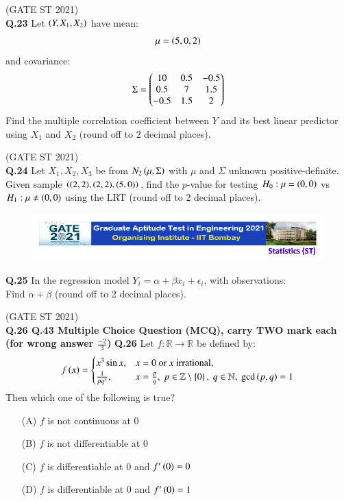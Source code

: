 \documentclass[journal,12pt,onecolumn]{IEEEtran}
\theoremstyle{remark}
\begin{document}
\hfill (GATE ST 2021) \\

\textbf{Q.23}
Let $\left(Y, X_1, X_2\right)$ have mean:
\[
\mu = \left(5,0,2\right)
\]
and covariance:
\[
\Sigma =
\begin{pmatrix}
10 & 0.5 & -0.5 \\
0.5 & 7 & 1.5 \\
-0.5 & 1.5 & 2\end{pmatrix}
\]
Find the multiple correlation coefficient between $Y$ and its best linear predictor using $X_1$ and $X_2$ (round off to 2 decimal places).

\hfill (GATE ST 2021) \\

\textbf{Q.24}
Let $X_1, X_2, X_3$ be from $N_2\left(\mu, \Sigma\right)$ with $\mu$ and $\Sigma$ unknown positive-definite.  
Given sample $\left((2,2), (2,2), (5,0)\right)$, find the $p$-value for testing $H_0: \mu = \left(0,0\right)$ vs $H_1: \mu \neq \left(0,0\right)$ using the LRT (round off to 2 decimal places).


\begin{figure}
 \centering
    \includegraphics[width=1\linewidth]{figs/0.png} 
\end{figure}
\textbf{Q.25}
In the regression model $Y_i = \alpha + \beta x_i + \epsilon_i$,  
with observations: \\
 
\bigskip
Find $\alpha + \beta$ (round off to 2 decimal places).

\hfill (GATE ST 2021) \\

\textbf{Q.26 \text{-} Q.43 Multiple Choice Question (MCQ), carry TWO mark each (for wrong answer $\frac{-2}{3}$)}
\textbf{Q.26}
Let $f: \mathbb{R} \to \mathbb{R}$ be defined by:
\[
f\left(x\right) =
\begin{cases}
x^3 \sin x, & x = 0 \ \text{or $x$ irrational}, \\
\frac{1}{p q^3}, & x = \frac{p}{q}, \ p \in \mathbb{Z} \setminus \left\{0\right\}, \ q \in \mathbb{N}, \ \gcd\left(p,q\right) = 1
\end{cases}
\]
Then which one of the following is true?
\begin{enumerate}
\item[(A)] $f$ is not continuous at $0$
\item[(B)] $f$ is not differentiable at $0$
\item[(C)] $f$ is differentiable at $0$ and $f'\left(0\right) = 0$
\item[(D)] $f$ is differentiable at $0$ and $f'\left(0\right) = 1$
\end{enumerate}
\end{document}
